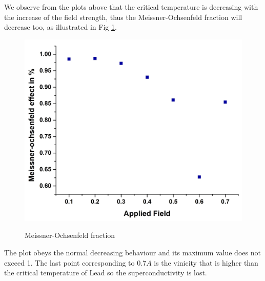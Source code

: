 \documentclass[openany,11pt,a4paper]{report}
\begin{document}
We observe from the plots above that the critical temperature is decreasing with the increase of the field strength, thus the Meissner-Ochsenfeld fraction will decrease too, as illustrated in Fig \ref{moe}.



\begin{figure}[H]
\centering
\caption{Meissner-Ochsenfeld fraction}\includegraphics[scale=0.5]
{moe.jpg}  
\label{moe}
\end{figure}

The plot obeys the normal decreasing behaviour and its maximum value does not exceed 1. The last point corresponding to $0.7 A$ is the vinicity that is higher than the critical temperature of Lead so the superconductivity is lost.
\end{document}

